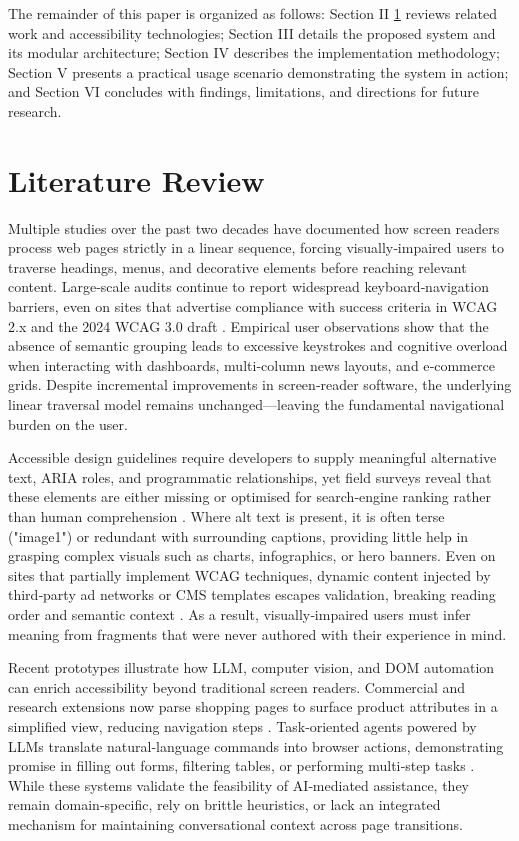 \documentclass[conference]{IEEEtran}
\begin{document}
The remainder of this paper is organized as follows: Section II \ref{review} reviews related work and accessibility technologies; Section III details the proposed system and its modular architecture; Section IV describes the implementation methodology; Section V presents a practical usage scenario demonstrating the system in action; and Section VI concludes with findings, limitations, and directions for future research.


\section{Literature Review}\label{review}

Multiple studies over the past two decades have documented how screen readers process web pages strictly in a linear sequence, forcing visually‑impaired users to traverse headings, menus, and decorative elements before reaching relevant content. Large‑scale audits continue to report widespread keyboard‑navigation barriers, even on sites that advertise compliance with success criteria in WCAG 2.x and the 2024 WCAG 3.0 draft \cite{kerdar2024,wcagchallenges2025}. Empirical user observations show that the absence of semantic grouping leads to excessive keystrokes and cognitive overload when interacting with dashboards, multi‑column news layouts, and e‑commerce grids. Despite incremental improvements in screen‑reader software, the underlying linear traversal model remains unchanged—leaving the fundamental navigational burden on the user.

Accessible design guidelines require developers to supply meaningful alternative text, ARIA roles, and programmatic relationships, yet field surveys reveal that these elements are either missing or optimised for search‑engine ranking rather than human comprehension \cite{wcag2023}. Where alt text is present, it is often terse ("image1") or redundant with surrounding captions, providing little help in grasping complex visuals such as charts, infographics, or hero banners. Even on sites that partially implement WCAG techniques, dynamic content injected by third‑party ad networks or CMS templates escapes validation, breaking reading order and semantic context \cite{wcagchallenges2025}. As a result, visually‑impaired users must infer meaning from fragments that were never authored with their experience in mind.

Recent prototypes illustrate how LLM, computer vision, and DOM automation can enrich accessibility beyond traditional screen readers. Commercial and research extensions now parse shopping pages to surface product attributes in a simplified view, reducing navigation steps \cite{prakash2024}. Task‑oriented agents powered by LLMs translate natural‑language commands into browser actions, demonstrating promise in filling out forms, filtering tables, or performing multi‑step tasks \cite{kodandaram2024,mehendale2024}. While these systems validate the feasibility of AI‑mediated assistance, they remain domain‑specific, rely on brittle heuristics, or lack an integrated mechanism for maintaining conversational context across page transitions.
\end{document}
